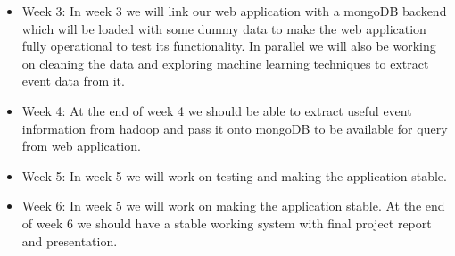 \begin{itemize}
\begin{itemize}
	\item{ Week 3:}
	In week 3 we will link our web application with a mongoDB backend which will be loaded with some dummy data to make the web application fully operational to test its functionality. In parallel we will also be working on cleaning the data and exploring machine learning techniques to extract event data from it. 
	
	\item{ Week 4:}
	At the end of week 4 we should be able to extract useful event information from hadoop and pass it onto mongoDB to be available for query from web application.
	
	\item{ Week 5:}
	In week 5 we will work on testing and making the application stable.
	
	\item{ Week 6:}
	 In week 5 we will work on making the application stable. At the end of week 6 we should have a stable working system with final project report and presentation.
	\end{itemize}
\end{itemize}
